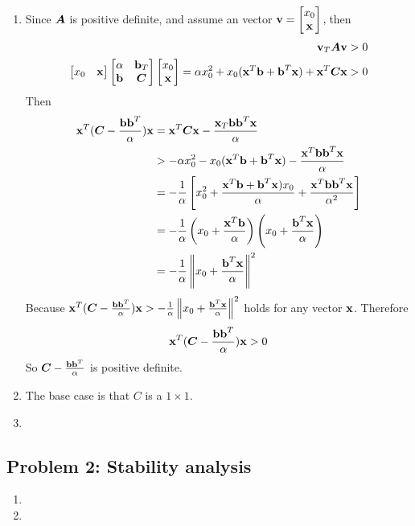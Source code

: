 \documentclass{article}
\begin{document}
\begin{enumerate}
\item 
Since $\mA$ is positive definite, and assume an vector $\vv = \bmat{x_0\\ \vx}, \\ $then \\
\begin{align*} 
\vv_T\mA\vv>0 \\
\bmat{x_0 & \vx}\bmat{\alpha & \vb_T\\ \vb & \mC} \bmat{x_0\\ \vx} = \alpha x_0^2 + x_0(\vx^T\vb+\vb^T\vx) + \vx^T\mC\vx >0  
\end{align*}
Then 
\begin{align*}
\vx^T(\mC-\frac{\vb\vb^T}{\alpha})\vx &= \vx^T\mC\vx - \frac{\vx_T\vb\vb^T\vx}{\alpha} \\
& > -\alpha x_0^2 - x_0(\vx^T\vb+\vb^T\vx) - \frac{\vx^T\vb\vb^T\vx}{\alpha} \\
& = -\frac{1}{\alpha} \left[x_0^2 + \frac{\vx^T\vb+\vb^T\vx)x_0}{\alpha}+\frac{\vx^T\vb\vb^T\vx}{\alpha^2}\right]\\
& = -\frac{1}{\alpha}\left(x_0+\frac{\vx^T\vb}{\alpha}\right)\left(x_0+\frac{\vb^T\vx}{\alpha}\right) \\
& =  -\frac{1}{\alpha}\left\|x_0+\frac{\vb^T\vx}{\alpha}\right\|^2 
\end{align*} 
Because $\vx^T(\mC-\frac{\vb\vb^T}{\alpha})\vx > -\frac{1}{\alpha}\left\|x_0+\frac{\vb^T\vx}{\alpha}\right\|^2$ holds for any vector $\vx$. Therefore \begin{align} 
\vx^T(\mC-\frac{\vb\vb^T}{\alpha})\vx > 0 
\end{align} 
So $\mC-\frac{\vb\vb^T}{\alpha}$ is positive definite. 

\item  
The base case is that $C$ is a $1\times1$. 

\item 
\end{enumerate}

\hypertarget{}{}
\subsection*{{Problem 2: Stability analysis}}
\label{}
\begin{enumerate} 
\item 

\item 

\end{enumerate} 
\end{document}
